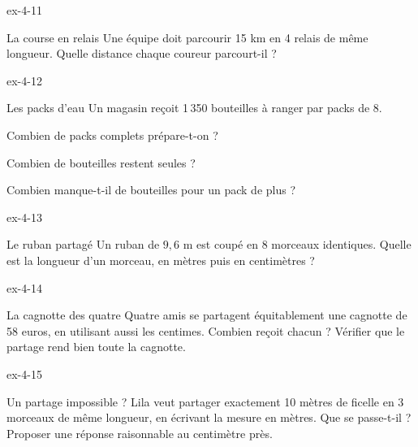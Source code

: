 \begin{blocLivre}{ex-4-11}\begin{exercice}[3]{La course en relais}
Une équipe doit parcourir 15 km en 4 relais de même longueur. Quelle distance chaque coureur parcourt-il ?
\end{exercice}\end{blocLivre}
\begin{blocLivre}{ex-4-12}\begin{exercice}[3]{Les packs d’eau}
Un magasin reçoit 1\,350 bouteilles à ranger par packs de 8.\begin{questions}
\item Combien de packs complets prépare-t-on ?
\item Combien de bouteilles restent seules ?
\item Combien manque-t-il de bouteilles pour un pack de plus ?
\end{questions}
\end{exercice}\end{blocLivre}
\begin{blocLivre}{ex-4-13}\begin{exercice}[3]{Le ruban partagé}
Un ruban de $9{,}6$ m est coupé en 8 morceaux identiques. Quelle est la longueur d’un morceau, en mètres puis en centimètres ?
\end{exercice}\end{blocLivre}
\begin{blocLivre}{ex-4-14}\begin{exercice}[3]{La cagnotte des quatre}
Quatre amis se partagent équitablement une cagnotte de 58 euros, en utilisant aussi les centimes. Combien reçoit chacun ? Vérifier que le partage rend bien toute la cagnotte.
\end{exercice}\end{blocLivre}
\begin{blocLivre}{ex-4-15}\begin{exercice}[3]{Un partage impossible ?}
Lila veut partager exactement 10 mètres de ficelle en 3 morceaux de même longueur, en écrivant la mesure en mètres. Que se passe-t-il ? Proposer une réponse raisonnable au centimètre près.
\end{exercice}\end{blocLivre}

\clearpage
